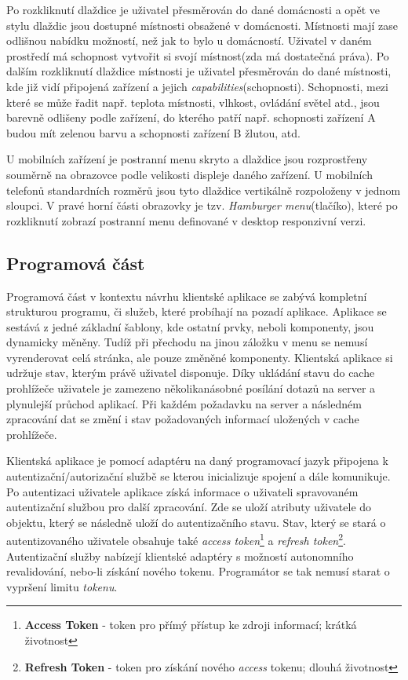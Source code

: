 Po rozkliknutí dlaždice je uživatel přesměrován do dané domácnosti a opět ve stylu dlaždic jsou dostupné místnosti obsažené v domácnosti.
Místnosti mají zase odlišnou nabídku možností, než jak to bylo u domácností.
Uživatel v daném prostředí má schopnost vytvořit si svojí místnost(zda má dostatečná práva).
Po dalším rozkliknutí dlaždice místnosti je uživatel přesměrován do dané místnosti, kde již vidí připojená zařízení a jejich \emph{capabilities}(schopnosti).
Schopnosti, mezi které se může řadit např. teplota místnosti, vlhkost, ovládání světel atd., jsou barevně odlišeny podle zařízení, do kterého patří např. schopnosti zařízení A budou mít zelenou barvu a schopnosti zařízení B žlutou, atd.

U mobilních zařízení je postranní menu skryto a dlaždice jsou rozprostřeny souměrně na obrazovce podle velikosti displeje daného zařízení.
U mobilních telefonů standardních rozměrů jsou tyto dlaždice vertikálně rozpoloženy v jednom sloupci.
V pravé horní části obrazovky je tzv. \emph{Hamburger menu}(tlačíko), které po rozkliknutí zobrazí postranní menu definované v desktop responzivní verzi.

\newpage
\subsection*{Programová část}
\label{frontend:program}
Programová část v kontextu návrhu klientské aplikace se zabývá kompletní strukturou programu, či služeb, které probíhají na pozadí aplikace.
Aplikace se sestává z jedné základní šablony, kde ostatní prvky, neboli komponenty, jsou dynamicky měněny.
Tudíž při přechodu na jinou záložku v menu se nemusí vyrenderovat celá stránka, ale pouze změněné komponenty.
Klientská aplikace si udržuje stav, kterým právě uživatel disponuje.
Díky ukládání stavu do cache prohlížeče uživatele je zamezeno několikanásobné posílání dotazů na server a plynulejší průchod aplikací.
Při každém požadavku na server a následném zpracování dat se změní i stav požadovaných informací uložených v cache prohlížeče.

Klientská aplikace je pomocí adaptéru na daný programovací jazyk připojena k autentizační/autorizační službě se kterou inicializuje spojení a dále komunikuje.
Po autentizaci uživatele aplikace získá informace o uživateli spravovaném autentizační službou pro další zpracování.
Zde se uloží atributy uživatele do objektu, který se následně uloží do autentizačního stavu.
Stav, který se stará o autentizovaného uživatele obsahuje také \emph{access token}\footnote{\textbf{Access Token} - token pro přímý přístup ke zdroji informací; krátká životnost} a \emph{refresh token}\footnote{\textbf{Refresh Token} - token pro získání nového \emph{access} tokenu; dlouhá životnost}.
Autentizační služby nabízejí klientské adaptéry s možností autonomního revalidování, nebo-li získání nového tokenu.
Programátor se tak nemusí starat o vypršení limitu \emph{tokenu}.

